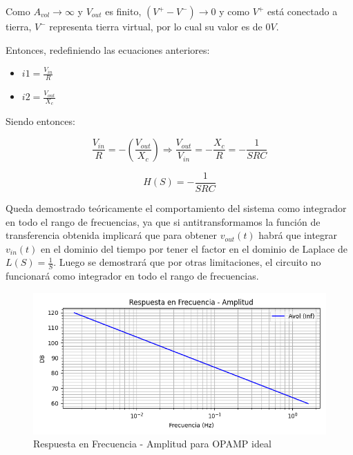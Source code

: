 Como ${A_{vol} \to \infty}$ y $V_{out}$ es finito, ${(V^{+}-V^{-}) \to 0}$ y como $V^{+}$ está conectado a tierra,
$V^{-}$ representa tierra virtual, por lo cual su valor es de $0V$.

Entonces, redefiniendo las ecuaciones anteriores:

\begin{itemize}
	\item $i1 = \frac{V_{in}}{R} $
	\item $i2 = \frac {V_{out}}{X_c}$
\end{itemize}

Siendo entonces:

$$ \frac{V_{in}}{R} = - (\frac{V_{out}}{X_c}) \Longrightarrow \frac{V_{out}}{V_{in}} = -\frac{X_c}{R} = - \frac{1}{SRC}$$

$$ H(S) = - \frac{1}{SRC}$$

Queda demostrado teóricamente el comportamiento del sistema como integrador en todo el rango de frecuencias, ya que si antitransformamos la función de transferencia
obtenida implicará que para obtener $v_{out}(t)$ habrá que integrar $v_{in}(t)$ en el dominio del tiempo por tener el factor en el dominio de Laplace de $L(S)=\frac{1}{S}$.
Luego se demostrará que por otras limitaciones, el circuito no funcionará como integrador en todo el rango de frecuencias.

\begin{figure}[H]
    \centering 
    \includegraphics [scale=0.6] {../Ejercicio3-CircuitoIntegradoresyDerivadores/Imagenes/teorico-avol-inf-integrador-amplitud.png} 
    \caption{Respuesta en Frecuencia - Amplitud para OPAMP ideal}
    \label{fig:emptyPlotTool}
\end{figure}

